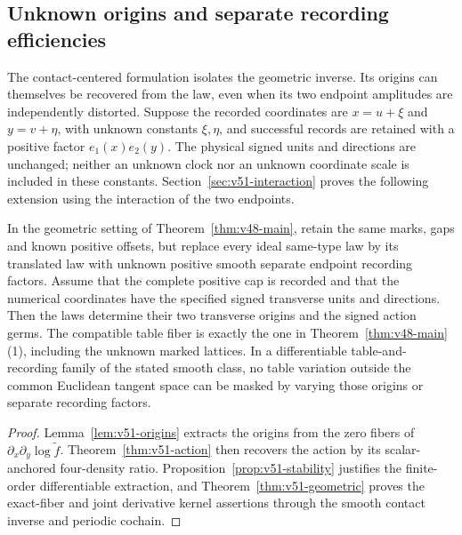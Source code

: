 \subsection{Unknown origins and separate recording efficiencies}

The contact-centered formulation isolates the geometric inverse.  Its
origins can themselves be recovered from the law, even when its two endpoint
amplitudes are independently distorted.  Suppose the recorded coordinates
are $x=u+\xi$ and $y=v+\eta$, with unknown constants $\xi,\eta$, and
successful records are retained with a positive factor $e_1(x)e_2(y)$.
The physical signed units and directions are unchanged; neither an unknown
clock nor an unknown coordinate scale is included in these constants.
Section~\ref{sec:v51-interaction} proves the following extension using the
interaction of the two endpoints.

\begin{structuraltheorem}
\label{thm:v51-main}
In the geometric setting of Theorem~\ref{thm:v48-main}, retain the same
marks, gaps and known positive offsets, but replace every ideal same-type
law by its translated law with unknown positive smooth separate endpoint
recording factors.  Assume that the complete positive cap is recorded and
that the numerical coordinates have the specified signed transverse units
and directions.  Then the laws determine their two transverse origins and
the signed action germs.  The compatible table fiber is exactly the one in
Theorem~\ref{thm:v48-main}(1), including the unknown marked lattices.
In a differentiable table-and-recording family of the stated smooth class,
no table variation outside the common Euclidean tangent space can be
masked by varying those origins or separate recording factors.
\end{structuraltheorem}

\begin{proof}
Lemma~\ref{lem:v51-origins} extracts the origins from the zero fibers of
$\partial_x\partial_y\log\widetilde f$.
Theorem~\ref{thm:v51-action} then recovers the action by its scalar-anchored
four-density ratio.  Proposition~\ref{prop:v51-stability} justifies the
finite-order differentiable extraction, and
Theorem~\ref{thm:v51-geometric} proves the exact-fiber and joint derivative
kernel assertions through the smooth contact inverse and periodic cochain.
\end{proof}

